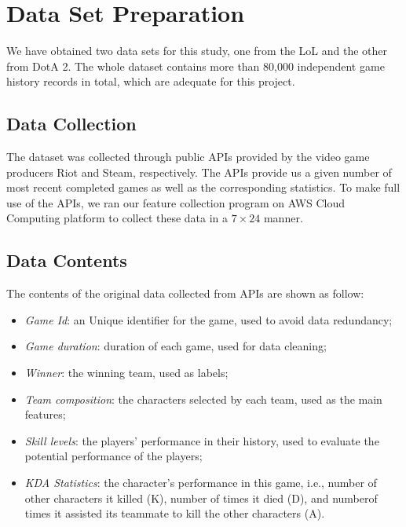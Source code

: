 \documentclass{article} %
\begin{document}



\section{Data Set Preparation}
We have obtained two data sets for this study, one from the LoL and the other from DotA 2. The whole dataset contains more than 80,000 independent game history records in total, which are adequate for this project.

\subsection{Data Collection}

The dataset was collected through public APIs provided by the video game producers Riot and Steam, respectively. The APIs provide us a given number of most recent completed games as well as the corresponding statistics. To make full use of the APIs, we ran our feature collection program on AWS Cloud Computing platform to collect these data in a $7\times24$ manner.


\subsection{Data Contents}

The contents of the original data collected from APIs are shown as follow:


\begin{itemize}
\item \textit{Game Id}: an Unique identifier for the game, used to avoid data redundancy;
\item \textit{Game duration}: duration of each game, used for data cleaning;
\item \textit{Winner}: the winning team, used as labels;
\item \textit{Team composition}: the characters selected by each team, used as the main features;
\item \textit{Skill levels}: the players' performance in their history, used to evaluate the potential performance of the players;
\item \textit{KDA Statistics}: the character's performance in this game, i.e., number of other characters it killed (K), number of times it died (D), and numberof times it assisted its teammate to kill the other characters (A).
\end{itemize}
\end{document}
